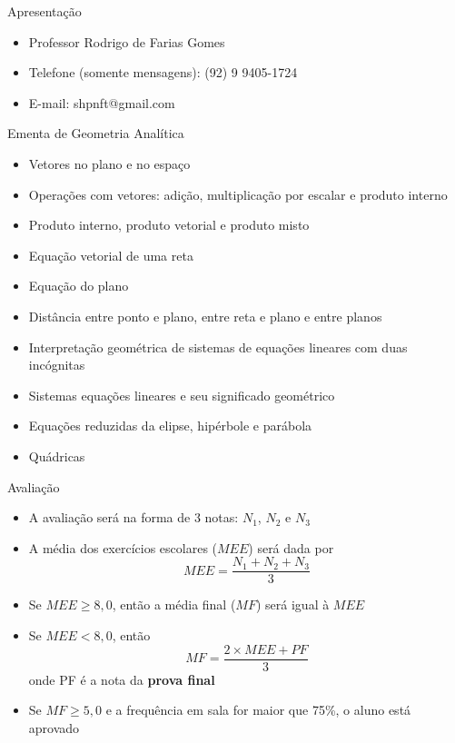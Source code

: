 \begin{frame} %
    \titlepage
\end{frame}

\begin{frame}[c]{Apresentação}
    \begin{itemize}
        \item Professor Rodrigo de Farias Gomes
        \item Telefone (somente mensagens): (92) 9 9405-1724
        \item E-mail: shpnft@gmail.com
    \end{itemize}
\end{frame}

\begin{frame}{Ementa de Geometria Analítica}
    \begin{itemize}
        \item Vetores no plano e no espaço
        \item Operações com vetores: adição, multiplicação por escalar e produto interno
        \item Produto interno, produto vetorial e produto misto
        \item Equação vetorial de uma reta
        \item Equação do plano
        \item Distância entre ponto e plano, entre reta e plano e entre planos
        \item Interpretação geométrica de sistemas de equações lineares com duas incógnitas
        \item Sistemas equações lineares e seu significado geométrico
        \item Equações reduzidas da elipse, hipérbole e parábola
        \item Quádricas
    \end{itemize}
\end{frame}

\begin{frame}{Avaliação}
    \begin{itemize}
        \item A avaliação será na forma de 3 notas: \(N_1\), \(N_2\) e \(N_3\)
        \item A média dos exercícios escolares (\(MEE\)) será dada por
            \[
                MEE=\frac{N_1+N_2+N_3}{3}
            \]
        \item Se \(MEE \geq 8,0\), então a média final (\(MF\)) será igual à \(MEE\)
        \item Se \(MEE < 8,0\), então
            \[
                MF=\frac{2\times MEE+PF}{3}
            \]
            onde PF é a nota da \textbf{prova final}
        \item Se \(MF \geq 5,0\) e a frequência em sala for maior que 75\%, o aluno está aprovado
    \end{itemize}
\end{frame}


